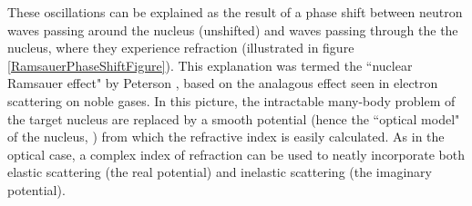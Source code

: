 \documentclass[twocolumn,secnumarabic,amssymb, nobibnotes, aps, prl,
superscriptaddress, nobalancelastpage]{revtex4}
\begin{document}

These oscillations can be explained as the result of a phase shift between 
neutron waves passing around the nucleus (unshifted) and waves passing
through the the nucleus, where they experience refraction
(illustrated in figure \ref{RamsauerPhaseShiftFigure}). This explanation was termed the ``nuclear 
Ramsauer effect" by Peterson \cite{Peterson1962}, based on the analagous effect seen in 
electron scattering on noble gases.
In this picture, the intractable many-body
problem of the target nucleus are replaced by a smooth potential (hence the
``optical model" of the nucleus, \cite{Feshbach1958}) from which the refractive
index is easily calculated. As in the optical case, a complex index of
refraction can be used to neatly incorporate both elastic scattering (the real
potential) and inelastic scattering (the imaginary potential).
\end{document}
